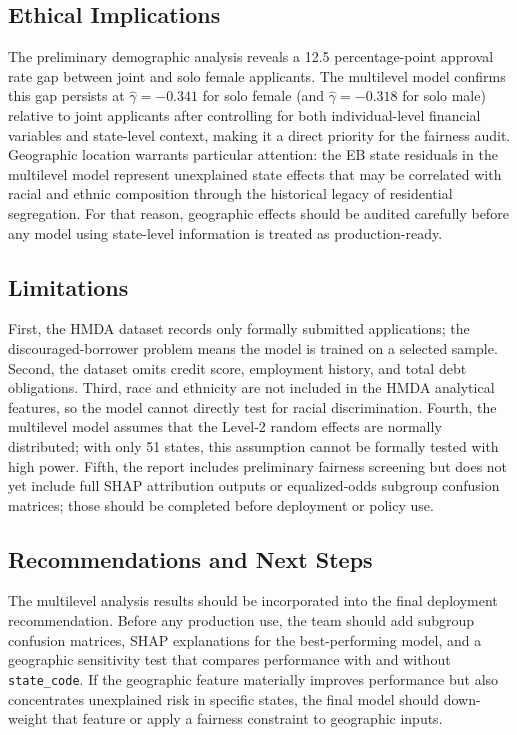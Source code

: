\documentclass[12pt,letterpaper]{article}
\begin{document}
\subsection{Ethical Implications}

The preliminary demographic analysis reveals a 12.5 percentage-point approval rate gap between
joint and solo female applicants. The multilevel model confirms this gap persists at
$\hat{\gamma} = -0.341$ for solo female (and $\hat{\gamma} = -0.318$ for solo male)
relative to joint applicants after controlling for both individual-level financial variables
and state-level context, making it a direct priority for the fairness audit. Geographic
location warrants particular attention: the EB state residuals in the multilevel model
represent unexplained state effects that may be correlated with racial and ethnic composition
through the historical legacy of residential segregation. For that reason, geographic effects
should be audited carefully before any model using state-level information is treated as
production-ready.

\subsection{Limitations}

First, the HMDA dataset records only formally submitted applications; the discouraged-borrower
problem means the model is trained on a selected sample. Second, the dataset omits credit score,
employment history, and total debt obligations. Third, race and ethnicity are not included in
the HMDA analytical features, so the model cannot directly test for racial discrimination.
Fourth, the multilevel model assumes that the Level-2 random effects are normally distributed;
with only 51 states, this assumption cannot be formally tested with high power. Fifth, the report includes preliminary fairness screening but does not yet include full SHAP
attribution outputs or equalized-odds subgroup confusion matrices; those should be completed
before deployment or policy use.

\subsection{Recommendations and Next Steps}

The multilevel analysis results should be incorporated into the final deployment recommendation.
Before any production use, the team should add subgroup confusion matrices, SHAP explanations for
the best-performing model, and a geographic sensitivity test that compares performance with and
without \texttt{state\_code}. If the geographic feature materially improves performance but also
concentrates unexplained risk in specific states, the final model should down-weight that feature
or apply a fairness constraint to geographic inputs.
\end{document}
